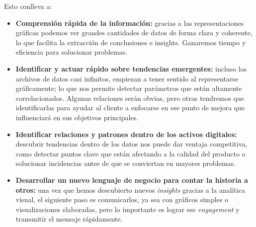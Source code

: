 \documentclass[preprint,12pt]{elsarticle}
\begin{document}
	Esto conlleva a:
	\begin{itemize}
		\item \textbf{Comprensión rápida de la información:} gracias a las representaciones gráficas podemos ver grandes cantidades de datos de forma clara y coherente, lo que facilita la extracción de conclusiones e insights. Ganaremos tiempo y eficiencia para solucionar problemas.
		\item \textbf{Identificar y actuar rápido sobre tendencias emergentes:} incluso los archivos de datos casi infinitos, empiezan a tener sentido al representarse gráficamente; lo que nos permite detectar parámetros que están altamente correlacionados. Algunas relaciones serán obvias, pero otras tendremos que identificarlas para ayudar al cliente a enfocarse en ese punto de mejora que influenciará en sus objetivos principales.
		\item \textbf{Identificar relaciones y patrones dentro de los activos digitales:} descubrir tendencias dentro de los datos nos puede dar ventaja competitiva, como detectar puntos clave que están afectando a la calidad del producto o solucionar incidencias antes de que se conviertan en mayores problemas.
		\item \textbf{Desarrollar un nuevo lenguaje de negocio para contar la historia a otros:} una vez que hemos descubierto nuevos \textit{insights} gracias a la analítica visual, el siguiente paso es comunicarlos, ya sea con gráficos simples o visualizaciones elaboradas, pero lo importante es lograr ese \textit{engagement} y transmitir el mensaje rápidamente.
	\end{itemize}
	
	
	
\end{document}
